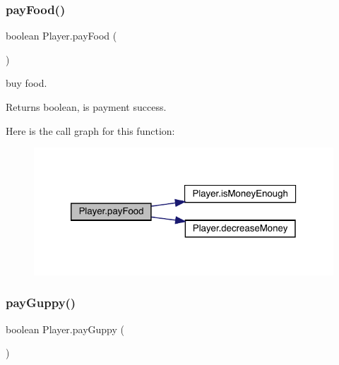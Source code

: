 \subsubsection{\texorpdfstring{pay\+Food()}{payFood()}}
{\footnotesize\ttfamily boolean Player.\+pay\+Food (\begin{DoxyParamCaption}{ }\end{DoxyParamCaption})\hspace{0.3cm}{\ttfamily [inline]}}

buy food. \begin{DoxyReturn}{Returns}
boolean, is payment success. 
\end{DoxyReturn}
Here is the call graph for this function\+:
\nopagebreak
\begin{figure}[H]
\begin{center}
\leavevmode
\includegraphics[width=320pt]{class_player_a61e99d628085fda9765af1d27b5d6d8d_cgraph}
\end{center}
\end{figure}
\mbox{\label{class_player_ae1169535a36bb44c7e37af0c7cf75410}} 
\subsubsection{\texorpdfstring{pay\+Guppy()}{payGuppy()}}
{\footnotesize\ttfamily boolean Player.\+pay\+Guppy (\begin{DoxyParamCaption}{ }\end{DoxyParamCaption})\hspace{0.3cm}{\ttfamily [inline]}}

